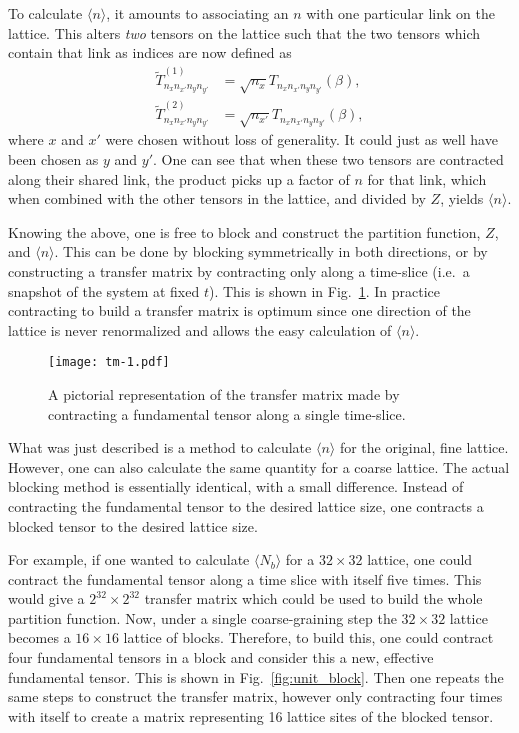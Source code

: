 \documentclass[../main.tex]{subfiles}
\begin{document}
To calculate $\langle n \rangle$, it amounts to associating an $n$ with one
particular link on the lattice.  This alters \emph{two} tensors on the lattice
such that the two tensors which contain that link as indices are now defined as
%
\begin{align}
	\tilde{T}^{(1)}_{n_{x} n_{x'} n_{y} n_{y'}}  &=
    \sqrt{n_{x}} T_{n_{x} n_{x'} n_{y} n_{y'}} (\beta),\\
    \tilde{T}^{(2)}_{n_{x} n_{x'} n_{y} n_{y'}}  &=
    \sqrt{n_{x'}}T_{n_{x} n_{x'} n_{y} n_{y'}} (\beta),
\end{align}
%
where $x$ and $x'$ were chosen without loss of generality.  It could just as
well have been chosen as $y$ and $y'$.  One can see that when these two tensors
are contracted along their shared link, the product picks up a factor of $n$
for that link, which when combined with the other tensors in the lattice, and
divided by $Z$, yields $\langle n \rangle$.

Knowing the above, one is free to block and construct the partition function,
$Z$, and $\langle n \rangle$.  This can be done by blocking symmetrically in
both directions, or by constructing a transfer matrix by contracting only along
a time-slice (i.e.\ a snapshot of the system at fixed $t$).  This is shown in
Fig.~\ref{fig:tm}.  In practice contracting to build a transfer matrix is
optimum since one direction of the lattice is never renormalized and allows the
easy calculation of $\langle n \rangle$.
%
%
\begin{figure}[htpb]
    \centering
	\texttt{[image: tm-1.pdf]}
    \caption{A pictorial representation of the transfer matrix made by
    contracting a fundamental tensor along a single time-slice.}%
\label{fig:tm}
\end{figure}
%
%
What was just described is a method to calculate $\langle n \rangle$ for the
original, fine lattice.  However, one can also calculate the same quantity for
a coarse lattice.  The actual blocking method is essentially identical, with a
small difference.  Instead of contracting the fundamental tensor to the desired
lattice size, one contracts a blocked tensor to the desired lattice size.

For example, if one wanted to calculate $\langle N_{b} \rangle$ for a $32
\times 32$ lattice, one could contract the fundamental tensor along a time
slice with itself five times.  This would give a $2^{32} \times 2^{32}$
transfer matrix which could be used to build the whole partition function.
Now, under a single coarse-graining step the $32\times 32$ lattice becomes a
$16\times 16$ lattice of blocks.  Therefore, to build this, one could contract
four fundamental tensors in a block and consider this a new, effective
fundamental tensor.  This is shown in Fig.~\ref{fig:unit_block}.  Then one
repeats the same steps to construct the transfer matrix, however only
contracting four times with itself to create a matrix representing 16 lattice
sites of the blocked tensor.
\end{document}
